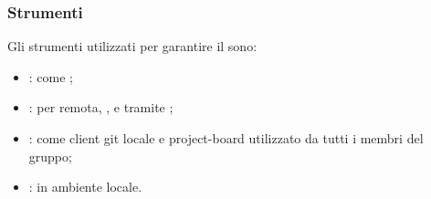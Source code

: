     \subsubsection{Strumenti}
    Gli strumenti utilizzati per garantire il  sono:
    \begin{itemize}
        \item \textbf{}: come ;
        \item \textbf{}: per  remota, ,  e  tramite ;
        \item \textbf{}: come client git locale e project-board utilizzato da tutti i membri del gruppo;
        \item \textbf{}:  in ambiente locale.
    \end{itemize}
